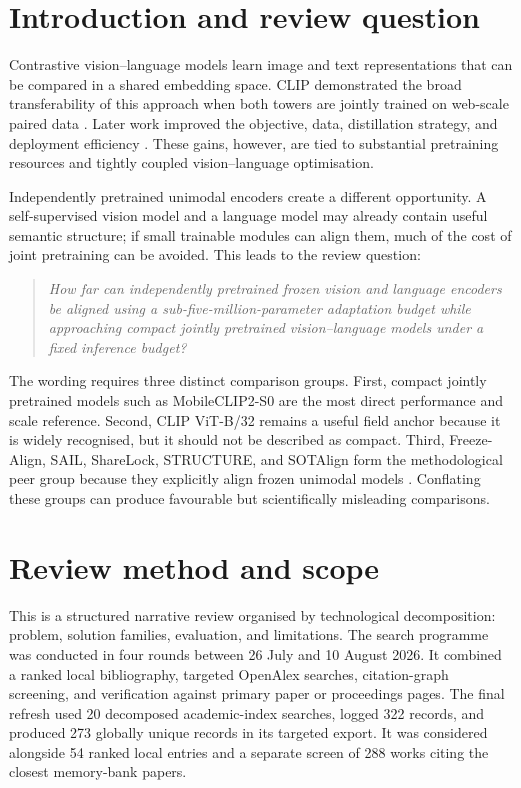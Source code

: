 \section{Introduction and review question}

Contrastive vision--language models learn image and text representations that
can be compared in a shared embedding space. CLIP demonstrated the broad
transferability of this approach when both towers are jointly trained on
web-scale paired data \cite{radford2021clip}. Later work improved the objective,
data, distillation strategy, and deployment efficiency
\cite{zhai2023siglip,vasu2024mobileclip,faghri2025mobileclip2}. These gains,
however, are tied to substantial pretraining resources and tightly coupled
vision--language optimisation.

Independently pretrained unimodal encoders create a different opportunity. A
self-supervised vision model and a language model may already contain useful
semantic structure; if small trainable modules can align them, much of the cost
of joint pretraining can be avoided. This leads to the review question:

\begin{quote}
\emph{How far can independently pretrained frozen vision and language encoders
be aligned using a sub-five-million-parameter adaptation budget while
approaching compact jointly pretrained vision--language models under a fixed
inference budget?}
\end{quote}

The wording requires three distinct comparison groups. First, compact jointly
pretrained models such as MobileCLIP2-S0 are the most direct performance and
scale reference. Second, CLIP ViT-B/32 remains a useful field anchor because it
is widely recognised, but it should not be described as compact. Third,
Freeze-Align, SAIL, ShareLock, STRUCTURE, and SOTAlign form the methodological
peer group because they explicitly align frozen unimodal models
\cite{maniparambil2025freezealign,zhang2025sail,ruthardt2026sharelock,groger2025structure,roschmann2026sotalign}.
Conflating these groups can produce favourable but scientifically misleading
comparisons.

\section{Review method and scope}

This is a structured narrative review organised by technological decomposition:
problem, solution families, evaluation, and limitations. The search programme
was conducted in four rounds between 26 July and 10 August 2026. It combined a
ranked local bibliography, targeted OpenAlex searches, citation-graph screening,
and verification against primary paper or proceedings pages. The final refresh
used 20 decomposed academic-index searches, logged 322 records, and produced 273
globally unique records in its targeted export. It was considered alongside 54
ranked local entries and a separate screen of 288 works citing the closest
memory-bank papers.


